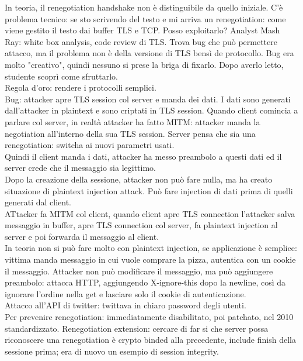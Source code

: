 \documentclass[16px]{article}
\begin{document}
In teoria, il renegotiation handshake non è distinguibile da quello iniziale. C'è problema tecnico: se sto scrivendo del testo e mi arriva un renegotiation: come viene gestito il testo dai buffer TLS e TCP. Posso exploitarlo? Analyst Mash Ray: white box analysis, code review di TLS. Trova bug che può permettere attacco, ma il problema non è della versione di TLS bensì de protocollo. Bug era molto "creativo", quindi nessuno si prese la briga di fixarlo. Dopo averlo letto, studente scoprì come sfruttarlo.\\ Regola d'oro: rendere i protocolli semplici.\\ Bug: attacker apre TLS session col server e manda dei dati. I dati sono generati dall'attacker in plaintext e sono criptati in TLS session. Quando client comincia a parlare col server, in realtà attacker ha fatto MITM: attacker manda la negotiation all'interno della sua TLS session. Server pensa che sia una renegotiation: switcha ai nuovi parametri usati.\\ Quindi il client manda i dati, attacker ha messo preambolo a questi dati ed il server crede che il messaggio sia legittimo.\\ Dopo la creazione della sessione, attacker non può fare nulla, ma ha creato situazione di plaintext injection attack. Può fare injection di dati prima di quelli generati dal client.\\ ATtacker fa MITM col client, quando client apre TLS connection l'attacker salva messaggio in buffer, apre TLS connection col server, fa plaintext injection al server e poi forwarda il messaggio al client.\\ In teoria non si può fare molto con plaintext injection, se applicazione è semplice: vittima manda messaggio in cui vuole comprare la pizza, autentica con un cookie il messaggio. Attacker non può modificare il messaggio, ma può aggiungere preambolo: attacca HTTP, aggiungendo X-ignore-this dopo la newline, così da ignorare l'ordine nella get e lasciare solo il cookie di autenticazione.\\ Attacco all'API di twitter: twittava in chiaro password degli utenti.\\ Per prevenire renegotiation: immediatamente disabilitato, poi patchato, nel 2010 standardizzato. Renegotiation extension: cercare di far si che server possa riconoscere una renegotiation è crypto binded alla precedente, include finish della sessione prima; era di nuovo un esempio di session integrity.
\end{document}

